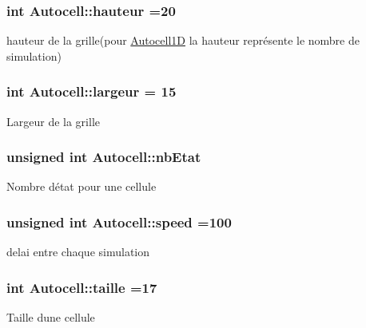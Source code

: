 \subsubsection[{\texorpdfstring{hauteur}{hauteur}}]{\setlength{\rightskip}{0pt plus 5cm}int Autocell\+::hauteur =20\hspace{0.3cm}{\ttfamily [protected]}}\hypertarget{class_autocell_a30f72e08777d91ecdd047ff5fa9b718f}{}\label{class_autocell_a30f72e08777d91ecdd047ff5fa9b718f}
hauteur de la grille(pour \hyperlink{class_autocell1_d}{Autocell1D} la hauteur représente le nombre de simulation) 
\subsubsection[{\texorpdfstring{largeur}{largeur}}]{\setlength{\rightskip}{0pt plus 5cm}int Autocell\+::largeur = 15\hspace{0.3cm}{\ttfamily [protected]}}\hypertarget{class_autocell_a7f7e3075befc2cae857ddbb9c4643ab7}{}\label{class_autocell_a7f7e3075befc2cae857ddbb9c4643ab7}
Largeur de la grille 
\subsubsection[{\texorpdfstring{nb\+Etat}{nbEtat}}]{\setlength{\rightskip}{0pt plus 5cm}unsigned int Autocell\+::nb\+Etat\hspace{0.3cm}{\ttfamily [protected]}}\hypertarget{class_autocell_a35a3592704f2fe987c846017b0fc83b2}{}\label{class_autocell_a35a3592704f2fe987c846017b0fc83b2}
Nombre d\textquotesingle{}état pour une cellule 
\subsubsection[{\texorpdfstring{speed}{speed}}]{\setlength{\rightskip}{0pt plus 5cm}unsigned int Autocell\+::speed =100\hspace{0.3cm}{\ttfamily [protected]}}\hypertarget{class_autocell_a52291657adce98a0443559a5cd2e0c0b}{}\label{class_autocell_a52291657adce98a0443559a5cd2e0c0b}
delai entre chaque simulation 
\subsubsection[{\texorpdfstring{taille}{taille}}]{\setlength{\rightskip}{0pt plus 5cm}int Autocell\+::taille =17\hspace{0.3cm}{\ttfamily [protected]}}\hypertarget{class_autocell_abcfd3af5e49b6a5b4538fb22a5f06d81}{}\label{class_autocell_abcfd3af5e49b6a5b4538fb22a5f06d81}
Taille d\textquotesingle{}une cellule 

